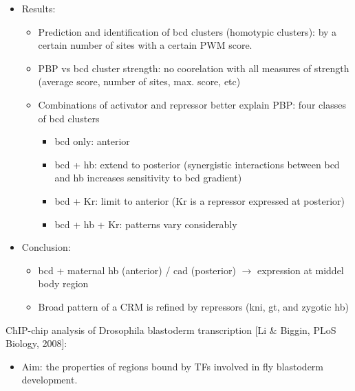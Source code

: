 \documentclass{report}
\begin{document}
\begin{enumerate}
\begin{itemize}
		\item Results:
		\begin{itemize}
			\item Prediction and identification of bcd clusters (homotypic clusters): by a certain number of sites with a certain PWM score. 
			\item PBP vs bcd cluster strength: no coorelation with all measures of strength (average score, number of sites, max. score, etc)
			\item Combinations of activator and repressor better explain PBP: four classes of bcd clusters
			\begin{itemize}
				\item bcd only: anterior
				\item bcd + hb: extend to posterior (synergistic interactions between bcd and hb increases sensitivity to bcd gradient)
				\item bcd + Kr: limit to anterior (Kr is a repressor expressed at posterior)
				\item bcd + hb + Kr: patterns vary considerably
			\end{itemize}
		\end{itemize}
		
		\item Conclusion:
		\begin{itemize}
			\item bcd + maternal hb (anterior) / cad (posterior) $\rightarrow$ expression at middel body region
			\item Broad pattern of a CRM is refined by repressors (kni, gt, and zygotic hb)
		\end{itemize}
	\end{itemize}
	
	ChIP-chip analysis of Drosophila blastoderm transcription [Li \& Biggin, PLoS Biology, 2008]:
	\begin{itemize}
		\item Aim: the properties of regions bound by TFs involved in fly blastoderm development. 
		

\end{itemize}
\end{enumerate}
\end{document}
